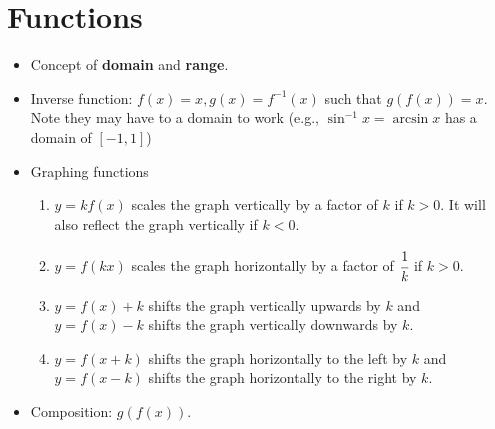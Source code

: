 \documentclass[letterpaper,12pt]{article}
\author{Shawn Ma}
\date{\today}
\begin{document}
\setlength{\parindent}{0pt}

\tableofcontents
\section{Functions}
\begin{itemize}
    \item Concept of \textbf{domain} and \textbf{range}.
    \item 
    Inverse function: $f(x)=x, g(x)=f^{-1}(x)$ such that $g(f(x))=x$. Note they may have to a domain to work (e.g., $\sin^{-1}x=\arcsin x$ has a domain of $[-1,1]$)
    \item Graphing functions
    \begin{enumerate}
        \item $y=kf(x)$ scales the graph vertically by a factor of $k$ if $k>0$. It will also reflect the graph vertically if $k<0$.
        \item $y=f(kx)$ scales the graph horizontally by a factor of $\cfrac{1}{k}$ if $k>0$.
        \item $y=f(x)+k$ shifts the graph vertically upwards by $k$ and
        $y=f(x)-k$ shifts the graph vertically downwards by $k$.
        \item $y=f(x+k)$ shifts the graph horizontally to the left by $k$ and
        $y=f(x-k)$ shifts the graph horizontally to the right by $k$.
    \end{enumerate}
    \item Composition: $g(f(x))$.
\end{itemize}
\end{document}
